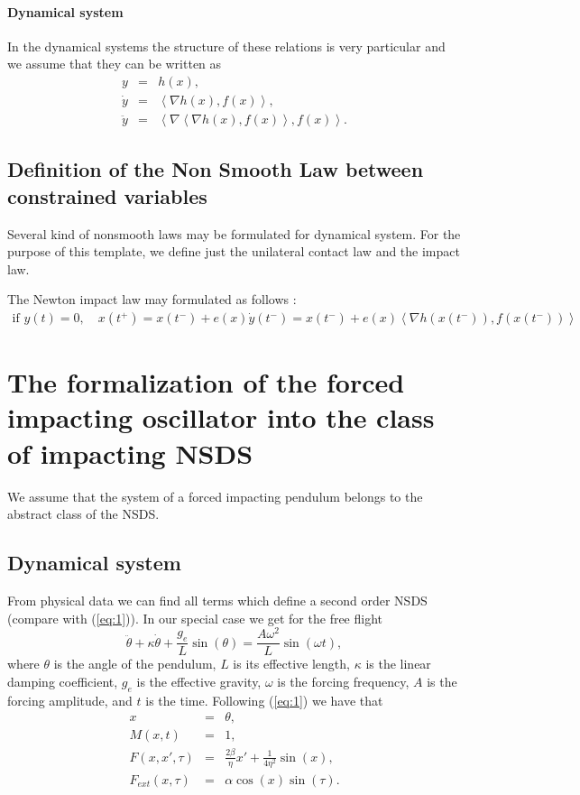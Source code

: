 \documentclass[10pt]{article}
\begin{document}
\paragraph{Dynamical system}
In the dynamical systems the structure of these relations is very particular and we assume that they can be written as
\begin{eqnarray}
  y&=& h(x),\label{eq:7a} \\ 
  \dot y &=&  \left\langle\nabla h(x),f(x)\right\rangle,\label{eq:7b} \\
  \ddot y &=&  \left\langle\nabla\left\langle\nabla h(x),f(x)\right\rangle,f(x)\right\rangle. \label{eq:7c}
\end{eqnarray}

\subsection{Definition of the Non Smooth Law between constrained variables}

Several kind of nonsmooth laws may be formulated for dynamical system. For the purpose of this template, we define just the unilateral contact law and the impact law.

The Newton impact law may formulated as follows :
\begin{eqnarray}
  \label{eq:13}
  \text{if } y(t)=0,\quad  x(t^+)=x(t^-) + e(x)\dot{y}(t^-) = x(t^-) + e(x)\left\langle\nabla h(x(t^-)),f(x(t^-))\right\rangle
\end{eqnarray}
 
\section{The formalization of the forced impacting oscillator into the class of impacting NSDS}
We assume that the system of a forced impacting pendulum belongs to the abstract class of the NSDS. 

\subsection{Dynamical system}
From physical data we can find all terms which define a second order NSDS (compare with (\ref{eq:1})). In our special case we get for the free flight
\begin{equation}
  \ddot{\theta} + \kappa\dot{\theta}+\frac{g_e}{L}\sin(\theta) = \frac{A\omega^2}{L}\sin(\omega t),
\end{equation}
where $\theta$ is the angle of the pendulum, $L$ is its effective length, $\kappa$ is the linear damping coefficient, $g_e$ is the effective gravity, $\omega$ is the forcing frequency, $A$ is the forcing amplitude, and $t$ is the time. Following (\ref{eq:1}) we have that 
\begin{eqnarray}
  x&=& \theta, \\
  M(x,t)&=& 1, \\
  F(x,x',\tau) &=& \frac{2\beta}{\eta}x' + \frac{1}{4\eta^2}\sin(x),\\
  F_{ext}(x,\tau)& = & \alpha\cos(x)\sin(\tau).
\end{eqnarray}
\end{document}
